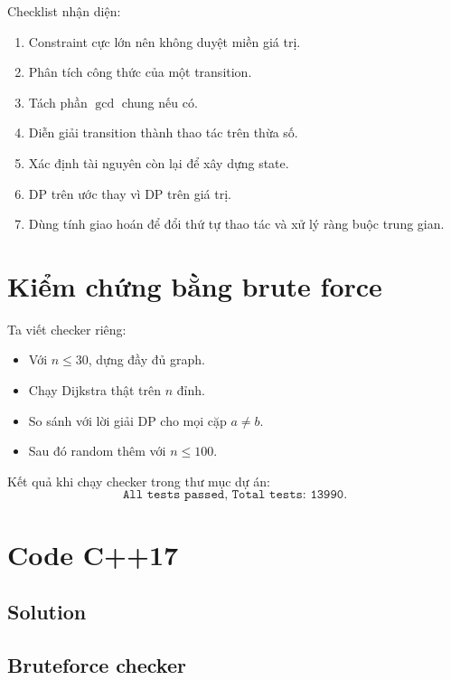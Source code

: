 \documentclass[11pt,a4paper]{article}
\begin{document}
Checklist nhận diện:

\begin{enumerate}
  \item Constraint cực lớn nên không duyệt miền giá trị.
  \item Phân tích công thức của một transition.
  \item Tách phần \(\gcd\) chung nếu có.
  \item Diễn giải transition thành thao tác trên thừa số.
  \item Xác định tài nguyên còn lại để xây dựng state.
  \item DP trên ước thay vì DP trên giá trị.
  \item Dùng tính giao hoán để đổi thứ tự thao tác và xử lý ràng buộc trung gian.
\end{enumerate}

\section{Kiểm chứng bằng brute force}

Ta viết checker riêng:

\begin{itemize}
  \item Với \(n\le 30\), dựng đầy đủ graph.
  \item Chạy Dijkstra thật trên \(n\) đỉnh.
  \item So sánh với lời giải DP cho mọi cặp \(a\ne b\).
  \item Sau đó random thêm với \(n\le 100\).
\end{itemize}

Kết quả khi chạy checker trong thư mục dự án:
\[
\texttt{All tests passed,\ Total tests: 13990.}
\]

\section{Code C++17}

\subsection{Solution}



\subsection{Bruteforce checker}


\end{document}

